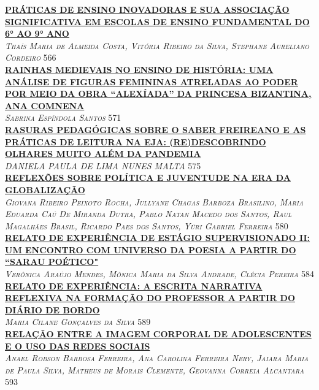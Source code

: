 \noindent \textsc{\hyperlink{trabalhos/243945.pdf.1}{\textbf{PRÁTICAS DE ENSINO INOVADORAS E SUA ASSOCIAÇÃO SIGNIFICATIVA EM ESCOLAS DE ENSINO FUNDAMENTAL DO 6° AO 9° ANO}}}\\ 
\noindent \textsc{\textit{Thaís Maria de Almeida Costa, Vitória Ribeiro da Silva, Stephane Aureliano Cordeiro}} \hfill 566\\ 

\noindent \textsc{\hyperlink{trabalhos/248743.pdf.1}{\textbf{RAINHAS MEDIEVAIS NO ENSINO DE HISTÓRIA: UMA ANÁLISE DE FIGURAS FEMININAS ATRELADAS AO PODER POR MEIO DA OBRA “ALEXÍADA” DA PRINCESA BIZANTINA, ANA COMNENA}}}\\ 
\noindent \textsc{\textit{Sabrina Espíndola Santos}} \hfill 571\\ 

\noindent \textsc{\hyperlink{trabalhos/249097.pdf.1}{\textbf{RASURAS  PEDAGÓGICAS  SOBRE O SABER  FREIREANO  E AS PRÁTICAS DE LEITURA NA EJA: (RE)DESCOBRINDO OLHARES MUITO ALÉM DA PANDEMIA }}}\\ 
\noindent \textsc{\textit{DANIELA PAULA DE LIMA NUNES MALTA}} \hfill 575\\ 

\noindent \textsc{\hyperlink{trabalhos/251433.pdf.1}{\textbf{REFLEXÕES SOBRE POLÍTICA E JUVENTUDE NA ERA DA GLOBALIZAÇÃO }}}\\ 
\noindent \textsc{\textit{Giovana Ribeiro Peixoto Rocha, Jullyane Chagas Barboza Brasilino, Maria Eduarda Caú De Miranda Dutra, Pablo Natan Macedo dos Santos, Raul Magalhães Brasil, Ricardo Paes dos Santos, Yúri Gabriel Ferreira}} \hfill 580\\ 

\noindent \textsc{\hyperlink{trabalhos/250268.pdf.1}{\textbf{RELATO DE EXPERIÊNCIA DE ESTÁGIO SUPERVISIONADO II: UM ENCONTRO COM UNIVERSO DA POESIA A PARTIR DO “SARAU POÉTICO"}}}\\ 
\noindent \textsc{\textit{Verônica Araújo Mendes, Mônica Maria da Silva Andrade, Clécia Pereira}} \hfill 584\\ 

\noindent \textsc{\hyperlink{trabalhos/249964.pdf.1}{\textbf{RELATO DE EXPERIÊNCIA: A ESCRITA NARRATIVA REFLEXIVA NA FORMAÇÃO DO PROFESSOR A PARTIR DO DIÁRIO DE BORDO }}}\\ 
\noindent \textsc{\textit{Maria Cilane Gonçalves da Silva}} \hfill 589\\ 

\noindent \textsc{\hyperlink{trabalhos/249901.pdf.1}{\textbf{RELAÇÃO ENTRE A IMAGEM CORPORAL DE ADOLESCENTES E O USO DAS REDES SOCIAIS}}}\\ 
\noindent \textsc{\textit{Anael Robson Barbosa Ferreira, Ana Carolina Ferreira Nery, Jaiara Maria de Paula Silva, Matheus de Morais Clemente, Geovanna Correia Alcantara}} \hfill 593\\ 

